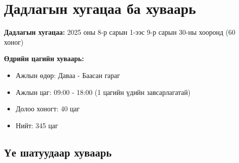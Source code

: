 \documentclass[main.tex]{subfiles}
\begin{document}
\section{Дадлагын хугацаа ба хуваарь}

\textbf{Дадлагын хугацаа:} 2025 оны 8-р сарын 1-ээс 9-р сарын 30-ны хооронд (60 хоног)

\textbf{Өдрийн цагийн хуваарь:}
\begin{itemize}
    \item Ажлын өдөр: Даваа - Баасан гараг
    \item Ажлын цаг: 09:00 - 18:00 (1 цагийн үдийн завсарлагатай)
    \item Долоо хоногт: 40 цаг
    \item Нийт: 345 цаг
\end{itemize}

\subsection{Үе шатуудаар хуваарь}
\end{document}
